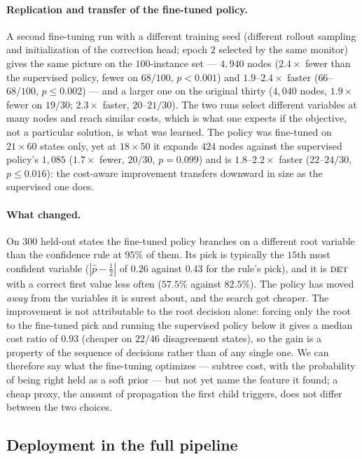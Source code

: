 \documentclass[preprint,12pt]{elsarticle}
\newcommand{\FORCED}{\textsc{det}}
\begin{document}
\paragraph{Replication and transfer of the fine-tuned policy.} A second fine-tuning run with a different training seed (different rollout sampling and initialization of the correction head; epoch $2$ selected by the same monitor) gives the same picture on the $100$-instance set --- $4{,}940$ nodes ($2.4\times$ fewer than the supervised policy, fewer on $68/100$, $p<0.001$) and $1.9$--$2.4\times$ faster ($66$--$68/100$, $p\le0.002$) --- and a larger one on the original thirty ($4{,}040$ nodes, $1.9\times$ fewer on $19/30$; $2.3\times$ faster, $20$--$21/30$). The two runs select different variables at many nodes and reach similar costs, which is what one expects if the objective, not a particular solution, is what was learned. The policy was fine-tuned on $21\times60$ states only, yet at $18\times50$ it expands $424$ nodes against the supervised policy's $1{,}085$ ($1.7\times$ fewer, $20/30$, $p=0.099$) and is $1.8$--$2.2\times$ faster ($22$--$24/30$, $p\le0.016$): the cost-aware improvement transfers downward in size as the supervised one does.

\paragraph{What changed.} On $300$ held-out states the fine-tuned policy branches on a different root variable than the confidence rule at $95\%$ of them. Its pick is typically the $15$th most confident variable ($|\hat p-\tfrac12|$ of $0.26$ against $0.43$ for the rule's pick), and it is $\FORCED$ with a correct first value less often ($57.5\%$ against $82.5\%$). The policy has moved \emph{away} from the variables it is surest about, and the search got cheaper. The improvement is not attributable to the root decision alone: forcing only the root to the fine-tuned pick and running the supervised policy below it gives a median cost ratio of $0.93$ (cheaper on $22/46$ disagreement states), so the gain is a property of the sequence of decisions rather than of any single one. We can therefore say what the fine-tuning optimizes --- subtree cost, with the probability of being right held as a soft prior --- but not yet name the feature it found; a cheap proxy, the amount of propagation the first child triggers, does not differ between the two choices.

\subsection{Deployment in the full pipeline}
\label{sec:exp-cascade}
\end{document}
